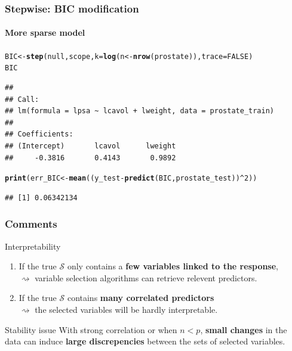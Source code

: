 \documentclass[10pt, c, xcolor=x11names]{beamer}\usepackage[]{graphicx}\usepackage[]{color}
\makeatletter
\newcommand{\hlnum}[1]{\textcolor[rgb]{0.686,0.059,0.569}{#1}}%
\newcommand{\hlopt}[1]{\textcolor[rgb]{0,0,0}{#1}}%
\newcommand{\hlstd}[1]{\textcolor[rgb]{0.345,0.345,0.345}{#1}}%
\newcommand{\hlkwb}[1]{\textcolor[rgb]{0.69,0.353,0.396}{#1}}%
\newcommand{\hlkwc}[1]{\textcolor[rgb]{0.333,0.667,0.333}{#1}}%
\newcommand{\hlkwd}[1]{\textcolor[rgb]{0.737,0.353,0.396}{\textbf{#1}}}%
\newenvironment{kframe}{%
 \def\at@end@of@kframe{}%
 \ifinner\ifhmode%
  \def\at@end@of@kframe{\end{minipage}}%
  \begin{minipage}{\columnwidth}%
 \fi\fi%
 \def\FrameCommand##1{\hskip\@totalleftmargin \hskip-\fboxsep
 \colorbox{shadecolor}{##1}\hskip-\fboxsep
     \hskip-\linewidth \hskip-\@totalleftmargin \hskip\columnwidth}%
 \MakeFramed {\advance\hsize-\width
   \@totalleftmargin\z@ \linewidth\hsize
   \@setminipage}}%
 {\par\unskip\endMakeFramed%
 \at@end@of@kframe}
\newenvironment{knitrout}{}{} %
\makeatother
\begin{document}
\begin{frame}[containsverbatim]
  \frametitle{Stepwise: BIC modification}
  \framesubtitle{More sparse model}
  
\begin{knitrout}\scriptsize
{}\color{fgcolor}\begin{kframe}
\begin{alltt}
\hlstd{BIC} \hlkwb{<-} \hlkwd{step}\hlstd{(null, scope,} \hlkwc{k} \hlstd{=} \hlkwd{log}\hlstd{(n} \hlkwb{<-} \hlkwd{nrow}\hlstd{(prostate)),} \hlkwc{trace}\hlstd{=}\hlnum{FALSE}\hlstd{)}
\hlstd{BIC}
\end{alltt}
\begin{verbatim}
## 
## Call:
## lm(formula = lpsa ~ lcavol + lweight, data = prostate_train)
## 
## Coefficients:
## (Intercept)       lcavol      lweight  
##     -0.3816       0.4143       0.9892
\end{verbatim}
\begin{alltt}
\hlkwd{print}\hlstd{(err_BIC}  \hlkwb{<-} \hlkwd{mean}\hlstd{((y_test} \hlopt{-} \hlkwd{predict}\hlstd{(BIC, prostate_test))}\hlopt{^}\hlnum{2}\hlstd{))}
\end{alltt}
\begin{verbatim}
## [1] 0.06342134
\end{verbatim}
\end{kframe}
\end{knitrout}
\end{frame}


\begin{frame}
  \frametitle{Comments}

  \begin{block}{Interpretability}
    \begin{enumerate}
    \item If the true $\mathcal{S}$ only contains a  \alert{\bf few
      variables linked to the response},\\
      $\rightsquigarrow$ variable selection algorithms can retrieve relevent predictors.
    \item  If the true   $\mathcal{S}$  contains  \alert{\bf many correlated predictors}\\
      $\rightsquigarrow$  the selected variables will be hardly interpretable.
    \end{enumerate}
  \end{block}

  \vfill

  \begin{block}{Stability issue}
    With strong correlation or when $n < p$, \alert{\bf small changes} in the data can induce   \alert{\bf large discrepencies }  between the sets of selected variables.
   \end{block}

\end{frame}
\end{document}
